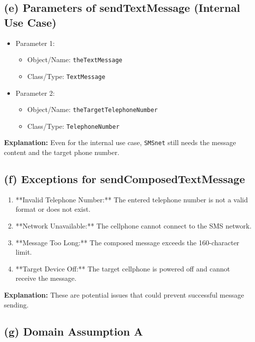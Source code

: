 \documentclass{article}
\begin{document}
\subsection*{(e) Parameters of sendTextMessage (Internal Use Case)}

\begin{itemize}
    \item Parameter 1:
    \begin{itemize}
        \item Object/Name: \texttt{theTextMessage}
        \item Class/Type: \texttt{TextMessage}
    \end{itemize}
    \item Parameter 2:
    \begin{itemize}
        \item Object/Name: \texttt{theTargetTelephoneNumber}
        \item Class/Type: \texttt{TelephoneNumber}
    \end{itemize}
\end{itemize}

\textbf{Explanation:} Even for the internal use case, \texttt{SMSnet} still needs the message content and the target phone number.

\subsection*{(f) Exceptions for sendComposedTextMessage}

\begin{enumerate}
    \item **Invalid Telephone Number:** The entered telephone number is not a valid format or does not exist.
    \item **Network Unavailable:** The cellphone cannot connect to the SMS network.
    \item **Message Too Long:** The composed message exceeds the 160-character limit.
    \item **Target Device Off:** The target cellphone is powered off and cannot receive the message.
\end{enumerate}

\textbf{Explanation:} These are potential issues that could prevent successful message sending.

\subsection*{(g) Domain Assumption A}
\end{document}
